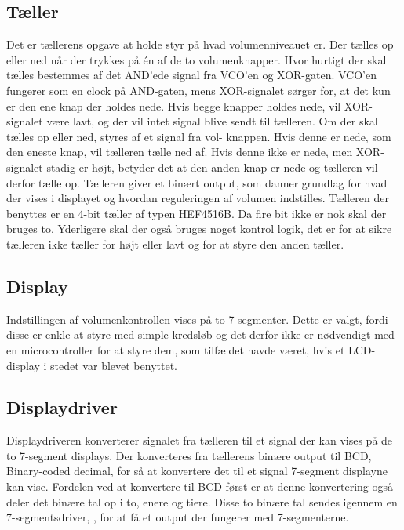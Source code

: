 \subsection*{Tæller}
\label{volumenkontrol-simulering-taeller}

Det er tællerens opgave at holde styr på hvad volumenniveauet er. Der tælles op eller ned når der trykkes på én af de to volumenknapper. Hvor hurtigt der skal tælles bestemmes af det AND'ede signal fra VCO'en og XOR-gaten. VCO'en fungerer som en clock på AND-gaten, mens XOR-signalet sørger for, at det kun er den ene knap der holdes nede. Hvis begge knapper holdes nede, vil XOR-signalet være lavt, og der vil intet signal blive sendt til tælleren. Om der skal tælles op eller ned, styres af et signal fra vol- knappen. Hvis denne er nede, som den eneste knap, vil tælleren tælle ned af. Hvis denne ikke er nede, men XOR-signalet stadig er højt, betyder det at den anden knap er nede og tælleren vil derfor tælle op. Tælleren giver et binært output, som danner grundlag for hvad der vises i displayet og hvordan reguleringen af volumen indstilles. Tælleren der benyttes er en 4-bit tæller af typen HEF4516B. Da fire bit ikke er nok skal der bruges to. Yderligere skal der også bruges noget kontrol logik, det er for at sikre tælleren ikke tæller for højt eller lavt og for at styre den anden tæller.

\subsection*{Display}
\label{volumenkontrol-simulering-display}
Indstillingen af volumenkontrollen vises på to 7-segmenter. Dette er valgt, fordi disse er enkle at styre med simple kredsløb og det derfor ikke er nødvendigt med en microcontroller for at styre dem, som tilfældet havde været, hvis et LCD-display i stedet var blevet benyttet.

\subsection*{Displaydriver}
\label{volumenkontrol-simulering-display_driver}
Displaydriveren konverterer signalet fra tælleren til et signal der kan vises på de to 7-segment displays. Der konverteres fra tællerens binære output til BCD, Binary-coded decimal, for så at konvertere det til et signal 7-segment displayne kan vise. Fordelen ved at konvertere til BCD først er at denne konvertering også deler det binære tal op i to, enere og tiere. Disse to binære tal sendes igennem en 7-segmentsdriver, , for at få et output der fungerer med 7-segmenterne.

